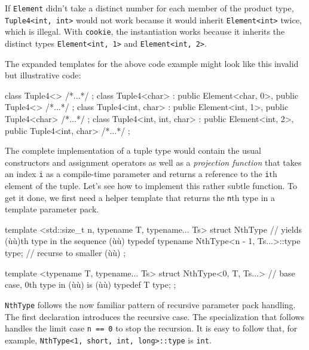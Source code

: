 If \lstinline!Element! didn't take a distinct number for each member of the
product type,\linebreak%
 \lstinline!Tuple4<int,!~\lstinline!int>! would not work because
it would inherit \lstinline!Element<int>! twice, which is illegal. With
\lstinline!cookie!, the instantiation works because it inherits the
distinct types\linebreak%
 \lstinline!Element<int,!~\lstinline!1>! and
\lstinline!Element<int,!~\lstinline!2>!.

The expanded templates for the above code example might look like this
invalid but illustrative code:

\begin{emcppslisting}[emcppsbatch=e37,emcppsignore={invalid but illustrative}]
class Tuple4<>
{ /*...*/ };
class Tuple4<char> : public Element<char, 0>, public Tuple4<>
{ /*...*/ };
class Tuple4<int, char> : public Element<int, 1>, public Tuple4<char>
{ /*...*/ };
class Tuple4<int, int, char> : public Element<int, 2>, public Tuple4<int, char>
{ /*...*/ };
\end{emcppslisting}
    

\noindent The complete implementation of a tuple type would contain the usual
constructors and assignment operators as well as a \emph{projection
function} that takes an index \lstinline!i! as a compile-time parameter and
returns a reference to the \lstinline!i!th element of the tuple. Let's see
how to implement this rather subtle function. To get it done, we first
need a helper template that returns the \lstinline!n!th type in a template
parameter pack.

\begin{emcppslisting}[emcppsbatch=e37]
template <std::size_t n, typename T, typename... Ts>
struct NthType               // yields (ù{}ù)th type in the sequence (ù{}ù)
{
    typedef typename NthType<n - 1, Ts...>::type
        type;                // recurse to smaller (ù{}ù)
};

template <typename T, typename... Ts>
struct NthType<0, T, Ts...>  // base case, 0th type in (ù{}ù) is (ù{}ù)
{
    typedef T type;
};
\end{emcppslisting}
    

\noindent \lstinline!NthType! follows the now familiar pattern of recursive parameter
pack handling. The first declaration introduces the recursive case. The
specialization that follows handles the limit case
\lstinline!n!~\lstinline!==!~\lstinline!0! to stop the recursion. It is easy to
follow that, for example,\linebreak%
\lstinline!NthType<1,!~\lstinline!short,!~\lstinline!int,!~\lstinline!long>::type!
is \lstinline!int!.

